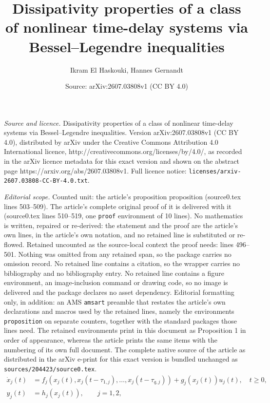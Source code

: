 \documentclass[10pt,a4paper]{amsart}
\title{Dissipativity properties of a class of nonlinear time-delay systems via Bessel--Legendre inequalities}
\author{Ikram El Haskouki, Hannes Gernandt}
\date{Source: arXiv:2607.03808v1 (CC BY 4.0)}
\begin{document}
\maketitle

\noindent\emph{Source and licence.} Dissipativity properties of a class of nonlinear time-delay systems via Bessel--Legendre inequalities. Version arXiv:2607.03808v1 (CC BY 4.0), distributed by arXiv under the Creative Commons Attribution 4.0 International licence, http://creativecommons.org/licenses/by/4.0/, as recorded in the arXiv licence metadata for this exact version and shown on the abstract page https://arxiv.org/abs/2607.03808v1. Full licence notice: \texttt{licenses/arxiv-2607.03808-CC-BY-4.0.txt}.\par\smallskip

\noindent\textit{Editorial scope.} Counted unit: the article's proposition proposition (source0.tex lines 503--509). The article's complete original proof of it is delivered with it (source0.tex lines 510--519, one \texttt{proof} environment of 10 lines). No mathematics is written, repaired or re-derived: the statement and the proof are the article's own lines, in the article's own notation, and no retained line is substituted or re-flowed.  Retained uncounted as the source-local context the proof needs: lines 496--501.  Nothing was omitted from any retained span, so the package carries no omission record.  No retained line contains a citation, so the wrapper carries no bibliography and no bibliography entry.  No retained line contains a figure environment, an image-inclusion command or drawing code, so no image is delivered and the package declares no asset dependency.  Editorial formatting only, in addition: an AMS \texttt{amsart} preamble that restates the article's own declarations and macros used by the retained lines, namely the environments \texttt{proposition} on separate counters, together with the standard packages those lines need.  The retained environments print in this document as Proposition 1 in order of appearance, whereas the article prints the same items with the numbering of its own full document.  The complete native source of the article as distributed in the arXiv e-print for this exact version is bundled unchanged as \texttt{sources/204423/source0.tex}.
\begin{align}\label{eq:Interconnection}
\nonumber 
\dot x_j(t) &= f_j(x_j(t),x_j(t-\tau_{1,j}),\ldots, x_j(t-\tau_{q,j})) 
  + g_j(x_j(t))u_j(t), \quad t\geq 0,\\
y_j(t) &= h_j(x_j(t)),\quad \quad j=1,2,
\end{align}
\end{document}
